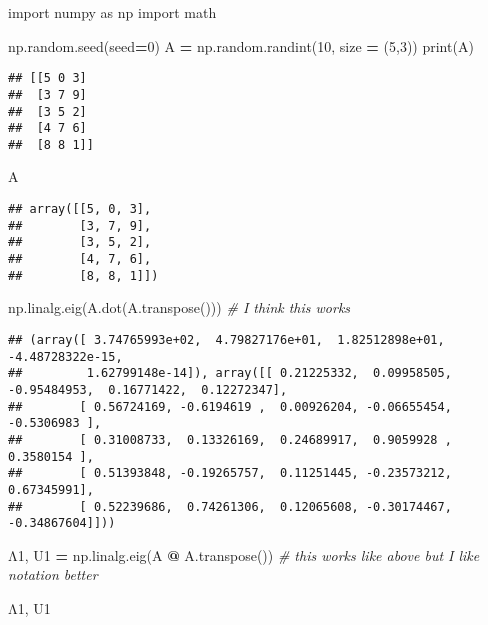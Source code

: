 \documentclass[]{article}
\author{}
\date{\vspace{-2.5em}}
\newenvironment{Shaded}{\begin{snugshade}}{\end{snugshade}}
\newcommand{\BuiltInTok}[1]{#1}
\newcommand{\CommentTok}[1]{\textcolor[rgb]{0.56,0.35,0.01}{\textit{#1}}}
\newcommand{\DecValTok}[1]{\textcolor[rgb]{0.00,0.00,0.81}{#1}}
\newcommand{\ImportTok}[1]{#1}
\newcommand{\NormalTok}[1]{#1}
\newcommand{\OperatorTok}[1]{\textcolor[rgb]{0.81,0.36,0.00}{\textbf{#1}}}
\begin{document}
\begin{Shaded}
\begin{Highlighting}[]

\ImportTok{import}\NormalTok{ numpy }\ImportTok{as}\NormalTok{ np}
\ImportTok{import}\NormalTok{ math}

\NormalTok{np.random.seed(seed}\OperatorTok{=}\DecValTok{0}\NormalTok{)}
\NormalTok{A }\OperatorTok{=}\NormalTok{ np.random.randint(}\DecValTok{10}\NormalTok{, size }\OperatorTok{=}\NormalTok{ (}\DecValTok{5}\NormalTok{,}\DecValTok{3}\NormalTok{))}
\BuiltInTok{print}\NormalTok{(A)}
\end{Highlighting}
\end{Shaded}

\begin{verbatim}
## [[5 0 3]
##  [3 7 9]
##  [3 5 2]
##  [4 7 6]
##  [8 8 1]]
\end{verbatim}

\begin{Shaded}
\begin{Highlighting}[]
\NormalTok{A}
\end{Highlighting}
\end{Shaded}

\begin{verbatim}
## array([[5, 0, 3],
##        [3, 7, 9],
##        [3, 5, 2],
##        [4, 7, 6],
##        [8, 8, 1]])
\end{verbatim}

\begin{Shaded}
\begin{Highlighting}[]
\NormalTok{np.linalg.eig(A.dot(A.transpose())) }\CommentTok{# I think this works}
\end{Highlighting}
\end{Shaded}

\begin{verbatim}
## (array([ 3.74765993e+02,  4.79827176e+01,  1.82512898e+01, -4.48728322e-15,
##         1.62799148e-14]), array([[ 0.21225332,  0.09958505, -0.95484953,  0.16771422,  0.12272347],
##        [ 0.56724169, -0.6194619 ,  0.00926204, -0.06655454, -0.5306983 ],
##        [ 0.31008733,  0.13326169,  0.24689917,  0.9059928 ,  0.3580154 ],
##        [ 0.51393848, -0.19265757,  0.11251445, -0.23573212,  0.67345991],
##        [ 0.52239686,  0.74261306,  0.12065608, -0.30174467, -0.34867604]]))
\end{verbatim}

\begin{Shaded}
\begin{Highlighting}[]
\NormalTok{Λ1, U1 }\OperatorTok{=}\NormalTok{ np.linalg.eig(A }\OperatorTok{@}\NormalTok{ A.transpose()) }\CommentTok{# this works like above but I like notation better}

\NormalTok{Λ1, U1}
\end{Highlighting}
\end{Shaded}
\end{document}
